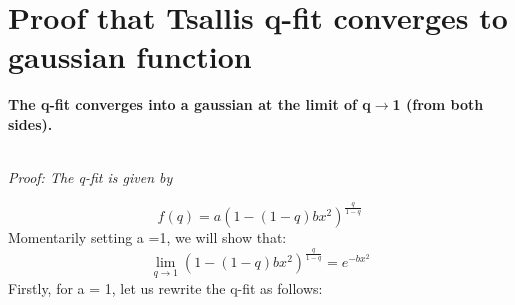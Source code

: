 \section{Proof that Tsallis q-fit converges to gaussian function}
\textbf{The q-fit converges into a gaussian at the limit of q$\rightarrow$1 (from both sides).} \\ \\
\centerline{\textit{Proof: The q-fit is given by}} 
\begin{equation}
f(q) = a(1-(1-q)bx^2)^{\frac{q}{1-q}}
\end{equation}
Momentarily setting a =1, we will show that:
\begin{equation}
\lim_{q \to 1} (1-(1-q)bx^2)^{\frac{q}{1-q}} = e^{-bx^2}
\end{equation}
Firstly, for a = 1, let us rewrite the q-fit as follows:
